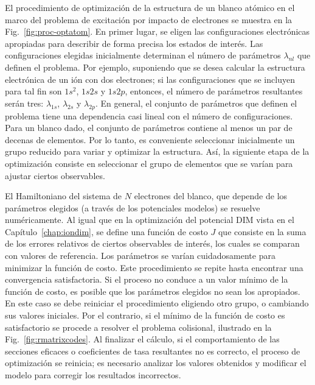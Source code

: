 El procedimiento de optimización de la estructura de un blanco atómico
en el marco del problema de excitación por impacto de electrones se 
muestra en la Fig.~\ref{fig:proc-optatom}. En primer lugar, se eligen 
las configuraciones electrónicas apropiadas para describir de forma 
precisa los estados de interés. Las configuraciones elegidas 
inicialmente determinan el número de parámetros $\lambda_{nl}$ que 
definen el problema. Por ejemplo, suponiendo que se desea calcular la 
estructura electrónica de un ión con dos electrones; 
si las configuraciones que se incluyen para tal fin son $1s^2$, $1s2s$ y 
$1s2p$, entonces, el número de parámetros resultantes serán tres: 
$\lambda_{1s}$, $\lambda_{2s}$ y $\lambda_{2p}$. En general, el conjunto
de parámetros que definen el problema tiene una dependencia casi lineal 
con el número de configuraciones. 
Para un blanco dado, el conjunto de parámetros contiene al menos un par 
de decenas de elementos. Por lo tanto, es 
conveniente seleccionar inicialmente un grupo reducido  
para variar y optimizar la estructura. Así, la siguiente etapa de la
optimización consiste en seleccionar el grupo de elementos que se varían
para ajustar ciertos observables. 

El Hamiltoniano del sistema de $N$ electrones del blanco, que depende de 
los parámetros elegidos (a través de los potenciales modelos) se 
resuelve numéricamente. Al igual que en la optimización del potencial 
DIM vista en el Capítulo~\ref{chap:iondim}, se define una función de 
costo $J$ que consiste en la suma de los errores relativos de ciertos 
observables de interés, los cuales se comparan con valores de referencia. 
Los parámetros se varían cuidadosamente para minimizar la función de 
costo. Este procedimiento se repite hasta encontrar una convergencia 
satisfactoria. Si el proceso no conduce a un valor mínimo de la función 
de costo, es posible  que los parámetros elegidos no sean los apropiados. 
En este caso se debe reiniciar el procedimiento eligiendo otro grupo, o 
cambiando sus valores iniciales.
Por el contrario, si el mínimo de la función de costo es satisfactorio 
se procede a resolver el problema colisional, ilustrado en la 
Fig.~\ref{fig:rmatrixcodes}. Al finalizar el cálculo, si el 
comportamiento de las secciones eficaces o coeficientes de tasa 
resultantes no es correcto, el proceso de optimización se reinicia; es 
necesario analizar los valores obtenidos y modificar el modelo para 
corregir los resultados incorrectos. 

